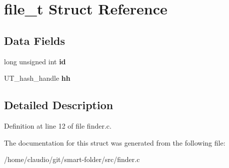 \hypertarget{structfile__t}{}\section{file\+\_\+t Struct Reference}
\label{structfile__t}
\subsection*{Data Fields}
\begin{DoxyCompactItemize}
\item 
long unsigned int {\bfseries id}\hypertarget{structfile__t_a44a772348760d7ca8095f707f652498a}{}\label{structfile__t_a44a772348760d7ca8095f707f652498a}

\item 
U\+T\+\_\+hash\+\_\+handle {\bfseries hh}\hypertarget{structfile__t_a67d3d81a4f9a9622b0befade8d131661}{}\label{structfile__t_a67d3d81a4f9a9622b0befade8d131661}

\end{DoxyCompactItemize}


\subsection{Detailed Description}


Definition at line 12 of file finder.\+c.



The documentation for this struct was generated from the following file\+:\begin{DoxyCompactItemize}
\item 
/home/claudio/git/smart-\/folder/src/finder.\+c\end{DoxyCompactItemize}
